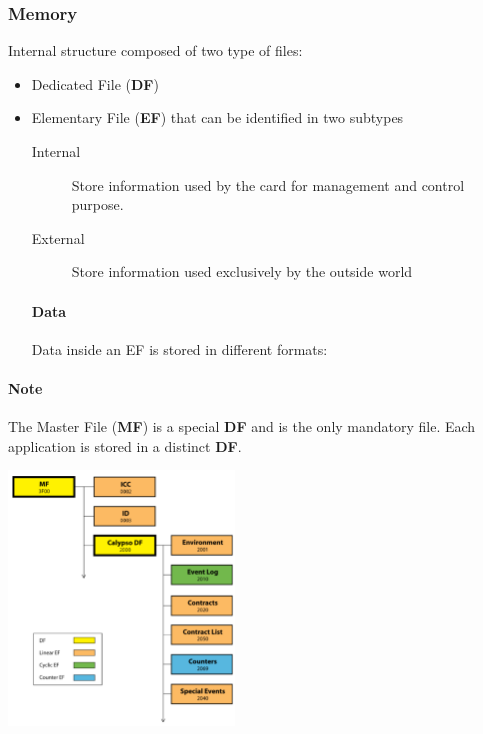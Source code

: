 \subsubsection{Memory}
    Internal structure composed of two type of files:
\begin{itemize}
    \item Dedicated File (\textbf{DF})
    \item Elementary File (\textbf{EF}) that can be identified in two subtypes
    \begin{description}
        \item[Internal] Store information used by the card for management and
        control purpose.
        \item[External] Store information used exclusively by the outside world
    \end{description}
    
    \paragraph{Data}
    Data inside an EF is stored in different formats:
\end{itemize}

\paragraph{Note} The Master File (\textbf{MF}) is a special \textbf{DF}
and is the only mandatory file. Each application is stored in a distinct
\textbf{DF}.

\begin{center}
    \includegraphics[width=6cm]{img/7816}
\end{center}

